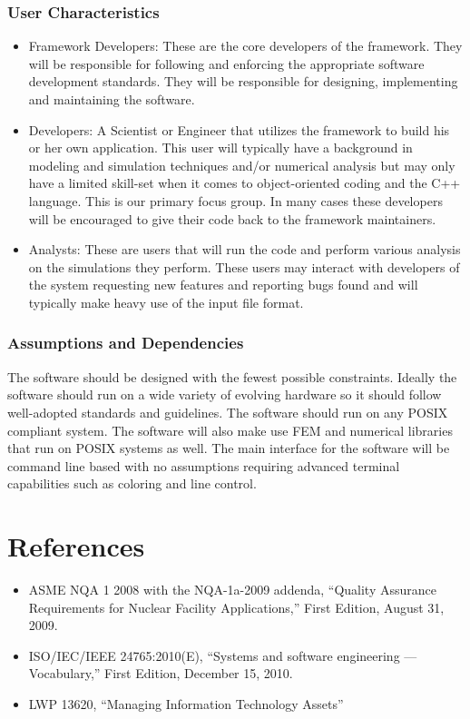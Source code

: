 \documentclass{INLreport}
\begin{document}
\subsubsection{User Characteristics}
\begin{itemize}
\item Framework Developers: These are the core developers of the framework. They will be responsible for following
  and enforcing the appropriate software development standards. They will be responsible for designing, implementing
  and maintaining the software.

\item Developers: A Scientist or Engineer that utilizes the framework to build his or her own application. This user
  will typically have a background in modeling and simulation techniques and/or numerical analysis but may only have
  a limited skill-set when it comes to object-oriented coding and the C++ language. This is our primary focus group.
  In many cases these developers will be encouraged to give their code back to the framework maintainers.

\item Analysts: These are users that will run the code and perform various analysis on the simulations they perform.
  These users may interact with developers of the system requesting new features and reporting bugs found and will
  typically make heavy use of the input file format.
\end{itemize}


\subsubsection{Assumptions and Dependencies}
The software should be designed with the fewest possible constraints. Ideally the software should run on a wide
variety of evolving hardware so it should follow well-adopted standards and guidelines. The software should run
on any POSIX compliant system. The software will also make use FEM and numerical libraries that run on POSIX
systems as well. The main interface for the software will be command line based with no assumptions requiring advanced
terminal capabilities such as coloring and line control.

\section{References}

\begin{itemize}
\item ASME NQA 1 2008 with the NQA-1a-2009 addenda, ``Quality Assurance Requirements for Nuclear Facility Applications,'' First Edition, August 31, 2009.
\item ISO/IEC/IEEE 24765:2010(E), ``Systems and software engineering — Vocabulary,'' First Edition, December 15, 2010.
\item LWP 13620, ``Managing Information Technology Assets''
\end{itemize}
\end{document}
